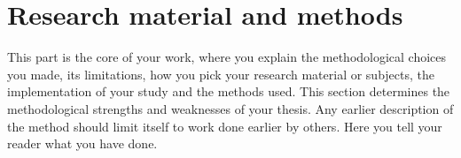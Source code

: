 \documentclass[english, 12pt, a4paper, elec, utf8, a-2b, online]{aaltothesis}
\begin{document}
%


\clearpage

\section{Research material and methods}

This part is the core of your work, where you explain the methodological choices
you made, its limitations, how you pick your research material or subjects, the
implementation of your study and the methods used. This section determines the
methodological strengths and weaknesses of your thesis. Any earlier description
of the method should limit itself to work done earlier by others. Here you tell
your reader what you have done.
\end{document}
